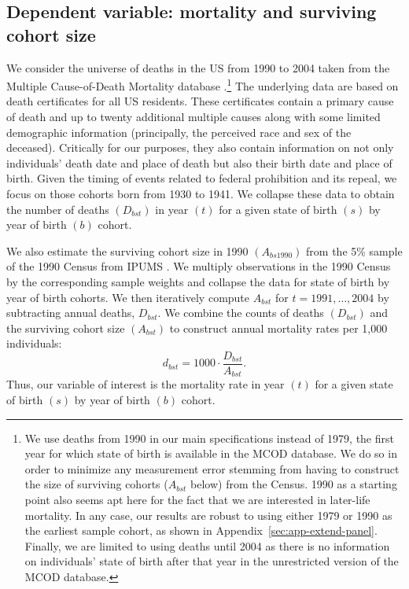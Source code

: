 \documentclass[12pt]{article}
\begin{document}
\subsection{Dependent variable: mortality and surviving cohort size}\label{sec:data-mortality}

We consider the universe of deaths in the US from 1990 to 2004 taken from the Multiple Cause-of-Death Mortality database .\footnote{We use deaths from 1990 in our main specifications instead of 1979, the first year for which state of birth is available in the MCOD database. 
We do so in order to minimize any measurement error stemming from having to construct the size of surviving cohorts ($A_{bst}$ below) from the Census. 
1990 as a starting point also seems apt here for the fact that we are interested in later-life mortality. 
In any case, our results are robust to using either 1979 or 1990 as the earliest sample cohort, as shown in Appendix~\ref{sec:app-extend-panel}. 
Finally, we are limited to using deaths until 2004 as there is no information on individuals' state of birth after that year in the unrestricted version of the MCOD database.
}
The underlying data are based on death certificates for all US residents. 
These certificates contain a primary cause of death and up to twenty additional multiple causes along with some limited demographic information (principally, the perceived race and sex of the deceased). 
Critically for our purposes, they also contain information on not only individuals' death date and place of death but also their birth date and place of birth. 
Given the timing of events related to federal prohibition and its repeal, we focus on those cohorts born from 1930 to 1941. 
We collapse these data to obtain the number of deaths $(D_{bst})$ in year $(t)$ for a given state of birth $(s)$ by year of birth $(b)$ cohort. 

We also estimate the surviving cohort size in 1990 $(A_{bs1990})$ from the 5\% sample of the 1990 Census from IPUMS . 
We multiply observations in the 1990 Census by the corresponding sample weights and collapse the data for state of birth by year of birth cohorts. 
We then iteratively compute $A_{bst}$ for $t = 1991, \ldots, 2004$ by subtracting annual deaths, $D_{bst}$. 
We combine the counts of deaths $(D_{bst})$ and the surviving cohort size $(A_{bst})$ to construct annual mortality rates per 1,000 individuals: $$d_{bst} = 1000 \cdot \frac{D_{bst}}{A_{bst}}.$$ 
Thus, our variable of interest is the mortality rate in year $(t)$ for a given state of birth $(s)$ by year of birth $(b)$ cohort. 
\end{document}
